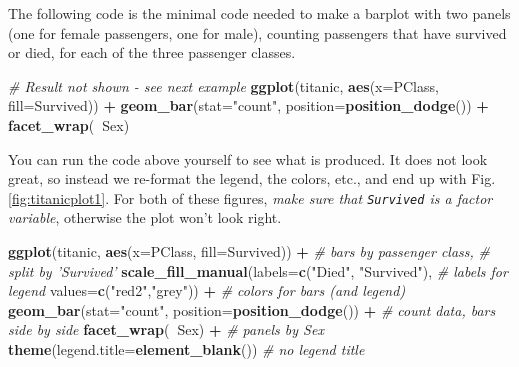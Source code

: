 \documentclass[]{book}
\newenvironment{Shaded}{\begin{snugshade}}{\end{snugshade}}
\newcommand{\CommentTok}[1]{\textcolor[rgb]{0.56,0.35,0.01}{\textit{#1}}}
\newcommand{\DataTypeTok}[1]{\textcolor[rgb]{0.13,0.29,0.53}{#1}}
\newcommand{\KeywordTok}[1]{\textcolor[rgb]{0.13,0.29,0.53}{\textbf{#1}}}
\newcommand{\NormalTok}[1]{#1}
\newcommand{\OperatorTok}[1]{\textcolor[rgb]{0.81,0.36,0.00}{\textbf{#1}}}
\newcommand{\StringTok}[1]{\textcolor[rgb]{0.31,0.60,0.02}{#1}}
\begin{document}
The following code is the minimal code needed to make a barplot with two panels (one for female passengers, one for male), counting passengers that have survived or died, for each of the three passenger classes.

\begin{Shaded}
\begin{Highlighting}[]
\CommentTok{# Result not shown - see next example}
\KeywordTok{ggplot}\NormalTok{(titanic, }\KeywordTok{aes}\NormalTok{(}\DataTypeTok{x=}\NormalTok{PClass, }\DataTypeTok{fill=}\NormalTok{Survived)) }\OperatorTok{+}
\StringTok{  }\KeywordTok{geom_bar}\NormalTok{(}\DataTypeTok{stat=}\StringTok{"count"}\NormalTok{, }\DataTypeTok{position=}\KeywordTok{position_dodge}\NormalTok{()) }\OperatorTok{+}
\StringTok{  }\KeywordTok{facet_wrap}\NormalTok{(}\OperatorTok{~}\NormalTok{Sex)}
\end{Highlighting}
\end{Shaded}

You can run the code above yourself to see what is produced. It does not look great, so instead we re-format the legend, the colors, etc., and end up with Fig. \ref{fig:titanicplot1}. For both of these figures, \emph{make sure that \texttt{Survived} is a factor variable}, otherwise the plot won't look right.

\begin{Shaded}
\begin{Highlighting}[]
\KeywordTok{ggplot}\NormalTok{(titanic, }\KeywordTok{aes}\NormalTok{(}\DataTypeTok{x=}\NormalTok{PClass, }\DataTypeTok{fill=}\NormalTok{Survived)) }\OperatorTok{+}\StringTok{        }\CommentTok{# bars by passenger class,}
\StringTok{                                                       }\CommentTok{# split by 'Survived'  }
\StringTok{  }\KeywordTok{scale_fill_manual}\NormalTok{(}\DataTypeTok{labels=}\KeywordTok{c}\NormalTok{(}\StringTok{"Died"}\NormalTok{, }\StringTok{"Survived"}\NormalTok{),      }\CommentTok{# labels for legend}
                    \DataTypeTok{values=}\KeywordTok{c}\NormalTok{(}\StringTok{"red2"}\NormalTok{,}\StringTok{"grey"}\NormalTok{)) }\OperatorTok{+}\StringTok{         }\CommentTok{# colors for bars (and legend)}
\StringTok{  }\KeywordTok{geom_bar}\NormalTok{(}\DataTypeTok{stat=}\StringTok{"count"}\NormalTok{, }\DataTypeTok{position=}\KeywordTok{position_dodge}\NormalTok{()) }\OperatorTok{+}\StringTok{  }\CommentTok{# count data, bars side by side}
\StringTok{  }\KeywordTok{facet_wrap}\NormalTok{(}\OperatorTok{~}\NormalTok{Sex) }\OperatorTok{+}\StringTok{                                   }\CommentTok{# panels by Sex}
\StringTok{  }\KeywordTok{theme}\NormalTok{(}\DataTypeTok{legend.title=}\KeywordTok{element_blank}\NormalTok{())                  }\CommentTok{# no legend title}
\end{Highlighting}
\end{Shaded}
\end{document}
